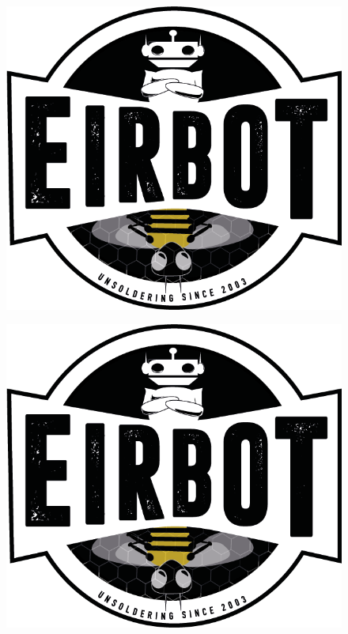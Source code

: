 \documentclass[a4paper,10pt]{article}
\begin{document}
\begin{spacing}{1.5}
\begin{multicols}{2}
  \begin{figure}[H]
    \center
    \includegraphics[scale=0.3]{LogoEirbot.png}
  \end{figure}
  \columnbreak
  \begin{figure}[H]
    \center
    \includegraphics[scale=0.3]{LogoEirbot.png}
  \end{figure}
\end{multicols}


\end{spacing}
\end{document}
